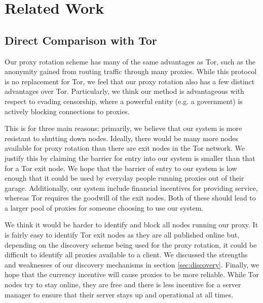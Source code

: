 \section{Related Work}
\label{sec:related}

\subsection{Direct Comparison with Tor}

Our proxy rotation scheme has many of the same advantages as Tor, such as the anonymity gained from routing traffic through many proxies. While this protocol is no replacement for Tor, we feel that our proxy rotation also has a few distinct advantages over Tor. Particularly, we think our method is advantageous with respect to evading censorship, where a powerful entity (e.g. a government) is actively blocking connections to proxies.

This is for three main reasons: primarily, we believe that our system is more resistant to shutting down nodes. Ideally, there would be many more nodes available for proxy rotation than there are exit nodes in the Tor network. We justify this by claiming the barrier for entry into our system is smaller than that for a Tor exit node. We hope that the barrier of entry to our system is low enough that it could be used by everyday people running proxies out of their garage.  Additionally, our system include financial incentives for providing service, whereas Tor requires the goodwill of the exit nodes. Both of these should lead to a larger pool of proxies for someone choosing to use our system.

We think it would be harder to identify and block all nodes running our proxy. It is fairly easy to identify Tor exit nodes as they are all published online\cite{tor:node} but, depending on the discovery scheme being used for the proxy rotation, it could be difficult to identify all proxies available to a client. We discussed the strengths and weaknesses of our discovery mechanisms in section \ref{sec:discovery}. Finally, we hope that the currency incentive will cause proxies to be more reliable. While Tor nodes try to stay online, they are free and there is less incentive for a server manager to ensure that their server stays up and operational at all times.

